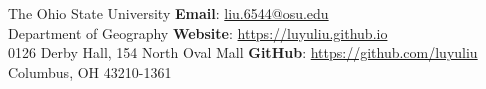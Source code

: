 \documentclass[letterpaper, 11pt]{article}
\begin{document}
\hfill{  The Ohio State University} \hfill{\large \textbf{Email}: \href{liu.6544@osu.edu}{liu.6544@osu.edu}} \\
\hfill{Department of Geography} \hfill{\large \textbf{Website}: \href{https://luyuliu.github.io}{https://luyuliu.github.io}} \\
\hfill{0126 Derby Hall, 154 North Oval Mall} \hfill{\large \textbf{GitHub}: \href{https://github.com/luyuliu}{https://github.com/luyuliu}} \\
{Columbus, OH 43210-1361} \\


\setlength{\tabcolsep}{0pt}
\end{document}
